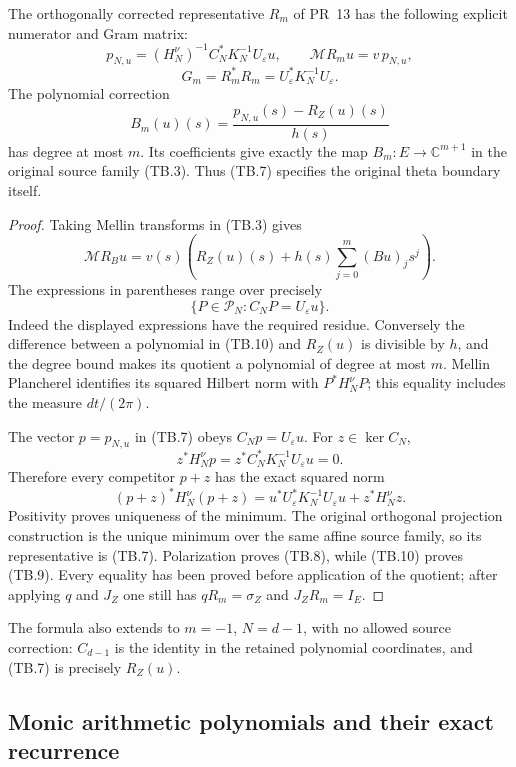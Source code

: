 \begin{theorem}
The orthogonally corrected representative \(R_m\) of PR~13 has
the following explicit numerator and Gram matrix:
\[
 p_{N,u}=(H_N^\nu)^{-1}C_N^*K_N^{-1}U_\varepsilon u,\qquad
 \mathcal MR_mu=v\,p_{N,u},
 \tag{TB.7}
\]
\[
 \boxed{G_m=R_m^*R_m=U_\varepsilon^*K_N^{-1}U_\varepsilon.}
 \tag{TB.8}
\]
The polynomial correction
\[
 B_m(u)(s)=\frac{p_{N,u}(s)-R_Z(u)(s)}{h(s)}
 \tag{TB.9}
\]
has degree at most \(m\).  Its coefficients give exactly the
map \(B_m:E\to\mathbb C^{m+1}\) in the original source family
(TB.3).  Thus (TB.7) specifies the original theta boundary itself.
\end{theorem}

\begin{proof}
Taking Mellin transforms in (TB.3) gives
\[
 \mathcal MR_Bu
 =v(s)\left(R_Z(u)(s)+h(s)\sum_{j=0}^m(Bu)_js^j\right).
\]
The expressions in parentheses range over precisely
\[
 \{P\in\mathcal P_N:C_NP=U_\varepsilon u\}.
 \tag{TB.10}
\]
Indeed the displayed expressions have the required residue.
Conversely the difference between a polynomial in (TB.10) and
\(R_Z(u)\) is divisible by \(h\), and the degree bound makes its
quotient a polynomial of degree at most \(m\).
Mellin Plancherel identifies its squared Hilbert norm with
\(P^*H_N^\nu P\); this equality includes the measure \(dt/(2\pi)\).

The vector \(p=p_{N,u}\) in (TB.7) obeys \(C_Np=U_\varepsilon u\).
For \(z\in\ker C_N\),
\[
 z^*H_N^\nu p
 =z^*C_N^*K_N^{-1}U_\varepsilon u=0.
\]
Therefore every competitor \(p+z\) has the exact squared norm
\[
 (p+z)^*H_N^\nu(p+z)
 =u^*U_\varepsilon^*K_N^{-1}U_\varepsilon u+z^*H_N^\nu z.
 \tag{TB.11}
\]
Positivity proves uniqueness of the minimum.  The original
orthogonal projection construction is the unique minimum over
the same affine source family, so its representative is (TB.7).
Polarization proves (TB.8), while (TB.10) proves (TB.9).
Every equality has been proved before application of the quotient;
after applying \(q\) and \(J_Z\) one still has
\(qR_m=\sigma_Z\) and \(J_ZR_m=I_E\).
\end{proof}

The formula also extends to \(m=-1\), \(N=d-1\), with no allowed
source correction: \(C_{d-1}\) is the identity in the retained
polynomial coordinates, and (TB.7) is precisely \(R_Z(u)\).

\subsection{Monic arithmetic polynomials and their exact recurrence}

